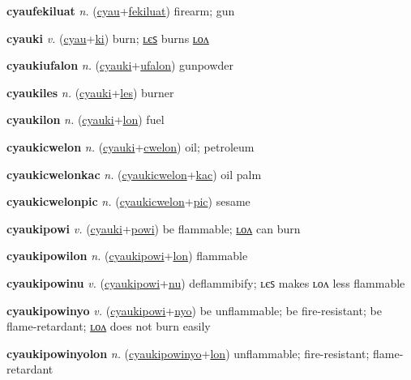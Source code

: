 \textbf{\hypertarget{cyaufekiluat}{cyaufekiluat}} \textit{n.} (\hyperlink{cyau}{cyau}+\allowbreak \hyperlink{fekiluat}{fekiluat})
firearm; gun

\textbf{\hypertarget{cyauki}{cyauki}} \textit{v.} (\hyperlink{cyau}{cyau}+\allowbreak \hyperlink{ki}{ki})
burn; \hyperlink{cyaukiles}{ʟєꜱ} burns \hyperlink{cyaukilon}{ʟᴏᴧ}

\textbf{\hypertarget{cyaukiufalon}{cyaukiufalon}} \textit{n.} (\hyperlink{cyauki}{cyauki}+\allowbreak \hyperlink{ufalon}{ufalon})
gunpowder

\textbf{\hypertarget{cyaukiles}{cyaukiles}} \textit{n.} (\hyperlink{cyauki}{cyauki}+\allowbreak \hyperlink{les}{les})
burner

\textbf{\hypertarget{cyaukilon}{cyaukilon}} \textit{n.} (\hyperlink{cyauki}{cyauki}+\allowbreak \hyperlink{lon}{lon})
fuel

\textbf{\hypertarget{cyaukicwelon}{cyaukicwelon}} \textit{n.} (\hyperlink{cyauki}{cyauki}+\allowbreak \hyperlink{cwelon}{cwelon})
oil; petroleum

\textbf{\hypertarget{cyaukicwelonkac}{cyaukicwelonkac}} \textit{n.} (\hyperlink{cyaukicwelon}{cyaukicwelon}+\allowbreak \hyperlink{kac}{kac})
oil palm

\textbf{\hypertarget{cyaukicwelonpic}{cyaukicwelonpic}} \textit{n.} (\hyperlink{cyaukicwelon}{cyaukicwelon}+\allowbreak \hyperlink{pic}{pic})
sesame

\textbf{\hypertarget{cyaukipowi}{cyaukipowi}} \textit{v.} (\hyperlink{cyauki}{cyauki}+\allowbreak \hyperlink{powi}{powi})
be flammable; \hyperlink{cyaukipowilon}{ʟᴏᴧ} can burn

\textbf{\hypertarget{cyaukipowilon}{cyaukipowilon}} \textit{n.} (\hyperlink{cyaukipowi}{cyaukipowi}+\allowbreak \hyperlink{lon}{lon})
flammable

\textbf{\hypertarget{cyaukipowinu}{cyaukipowinu}} \textit{v.} (\hyperlink{cyaukipowi}{cyaukipowi}+\allowbreak \hyperlink{nu}{nu})
deflammibify; ʟєꜱ makes ʟᴏᴧ less flammable

\textbf{\hypertarget{cyaukipowinyo}{cyaukipowinyo}} \textit{v.} (\hyperlink{cyaukipowi}{cyaukipowi}+\allowbreak \hyperlink{nyo}{nyo})
be unflammable; be fire-resistant; be flame-retardant; \hyperlink{cyaukipowinyolon}{ʟᴏᴧ} does not burn easily

\textbf{\hypertarget{cyaukipowinyolon}{cyaukipowinyolon}} \textit{n.} (\hyperlink{cyaukipowinyo}{cyaukipowinyo}+\allowbreak \hyperlink{lon}{lon})
unflammable; fire-resistant; flame-retardant

